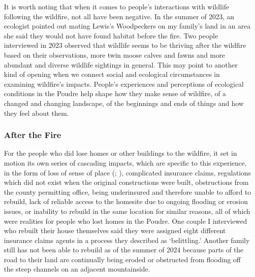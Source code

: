 \documentclass[
]{article}
\begin{document}
It is worth noting that when it comes to people's interactions with wildlife following the wildfire, not all have been negative. In the summer of 2023, an ecologist pointed out mating Lewis's Woodpeckers on my family's land in an area she said they would not have found habitat before the fire. Two people interviewed in 2023 observed that wildlife seems to be thriving after the wildfire based on their observations, more twin moose calves and fawns and more abundant and diverse wildlife sightings in general. This may point to another kind of opening when we connect social and ecological circumstances in examining wildfire's impacts. People's experiences and perceptions of ecological conditions in the Poudre help shape how they make sense of wildfire, of a changed and changing landscape, of the beginnings and ends of things and how they feel about them.

\subsubsection{After the Fire}\label{after-the-fire-1}

For the people who did lose homes or other buildings to the wildfire, it set in motion its own series of cascading impacts, which are specific to this experience, in the form of loss of sense of place (; ), complicated insurance claims, regulations which did not exist when the original constructions were built, obstructions from the county permitting office, being underinsured and therefore unable to afford to rebuild, lack of reliable access to the homesite due to ongoing flooding or erosion issues, or inability to rebuild in the same location for similar reasons, all of which were realities for people who lost homes in the Poudre. One couple I interviewed who rebuilt their house themselves said they were assigned eight different insurance claims agents in a process they described as `belittling.' Another family still has not been able to rebuild as of the summer of 2024 because parts of the road to their land are continually being eroded or obstructed from flooding off the steep channels on an adjacent mountainside.
\end{document}
